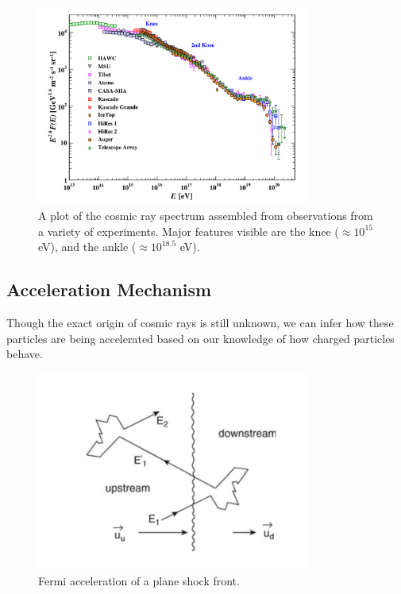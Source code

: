 \begin{figure}[h]
\centering
\includegraphics[width=0.8\textwidth]{figs/CR_Spectrum.png}
\caption{A plot of the cosmic ray spectrum assembled from observations from a variety of experiments. Major features visible are the knee ($\approx 10^{15} $ eV), and the ankle ($\approx 10^{18.5}$ eV). ~\cite{AustinThesis} }
\label{fig:CRSpectrum}
\end{figure}

\subsection{Acceleration Mechanism}
Though the exact origin of cosmic rays is still unknown, we can infer how these particles are being accelerated based on our knowledge of how charged particles behave. 
\begin{figure}[h]
\centering
\includegraphics[width=0.8\textwidth]{figs/FermiFig.png}
\caption{Fermi acceleration of a plane shock front\cite{pimenta_partphys}. }
\label{fig:fermifig}
\end{figure}

